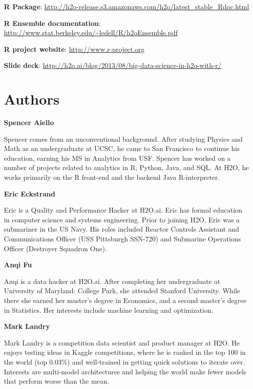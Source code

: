 {{{{{%

{\bfseries{R Package}}:  \url{http://h2o-release.s3.amazonaws.com/h2o/latest_stable_Rdoc.html}

{\bfseries{R Ensemble documentation}}: \url{http://www.stat.berkeley.edu/~ledell/R/h2oEnsemble.pdf} 

{\bfseries{R project website}}: \url{http://www.r-project.org} 

{\bfseries{Slide deck}}: \url{http://h2o.ai/blog/2013/08/big-data-science-in-h2o-with-r/} 



\newpage

\section{Authors}

\textbf{Spencer Aiello}

Spencer comes from an unconventional background. After studying Physics and Math as an undergraduate at UCSC, he came to San Francisco to continue his education, earning his MS in Analytics from USF.  Spencer has worked on a number of projects related to analytics in R, Python, Java, and SQL. At H2O, he works primarily on the R front-end and the backend Java R-interpreter.

\textbf{Eric Eckstrand}

Eric is a Quality and Performance Hacker at H2O.ai. Eric has formal education in computer science and systems engineering. Prior to joining H2O, Eric was a submariner in the US Navy. His roles included Reactor Controls Assistant and Communications Officer (USS Pittsburgh SSN-720) and Submarine Operations Officer (Destroyer Squadron One). 

\textbf{Anqi Fu}

Anqi is a data hacker at H2O.ai. After completing her undergraduate at University of Maryland: College Park, she attended Stanford University. While there she earned her master’s degree in Economics, and a second master’s degree in Statistics. Her interests include machine learning and optimization.

\textbf{Mark Landry}

Mark Landry is a competition data scientist and product manager at H2O. He enjoys testing ideas in Kaggle competitions, where he is ranked in the top 100 in the world (top 0.03$\%$) and well-trained in getting quick solutions to iterate over. Interests are multi-model architectures and helping the world make fewer models that perform worse than the mean.

}}}}}
